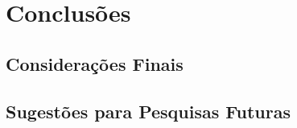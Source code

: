 \chapter{Conclusões}
\label{cap:conclusoes}


\section{Considerações Finais} 


\section{Sugestões para Pesquisas Futuras} 


